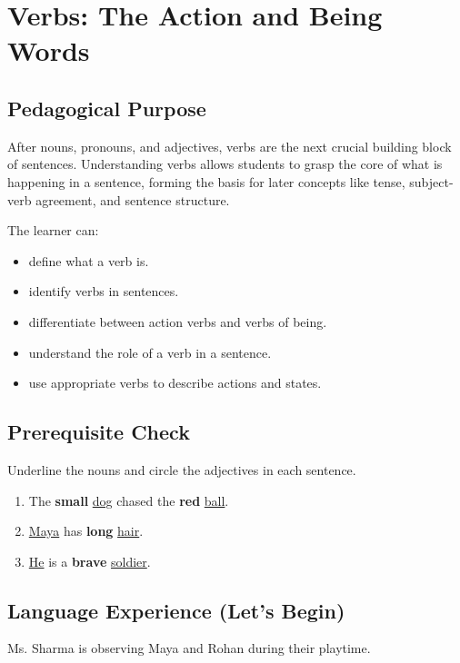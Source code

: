 
\chapter{Verbs: The Action and Being Words}

\section{Pedagogical Purpose}
After nouns, pronouns, and adjectives, verbs are the next crucial building block of sentences. Understanding verbs allows students to grasp the core of what is happening in a sentence, forming the basis for later concepts like tense, subject-verb agreement, and sentence structure.

\begin{learningobjectives}
The learner can:
\begin{itemize}
    \item define what a verb is.
    \item identify verbs in sentences.
    \item differentiate between action verbs and verbs of being.
    \item understand the role of a verb in a sentence.
    \item use appropriate verbs to describe actions and states.
\end{itemize}
\end{learningobjectives}

\section{Prerequisite Check}
\begin{quickcheck}
Underline the nouns and circle the adjectives in each sentence.
\begin{enumerate}
    \item The \textbf{small} \underline{dog} chased the \textbf{red} \underline{ball}.
    \item \underline{Maya} has \textbf{long} \underline{hair}.
    \item \underline{He} is a \textbf{brave} \underline{soldier}.
\end{enumerate}
\end{quickcheck}

\section{Language Experience (Let's Begin)}
Ms. Sharma is observing Maya and Rohan during their playtime.

